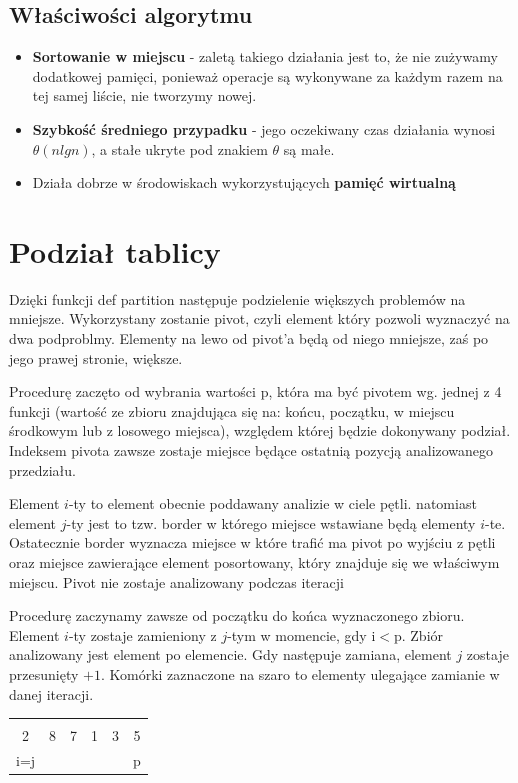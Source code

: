 \documentclass[a4paper,11pt]{report}
\begin{document}
\subsection*{Właściwości algorytmu}
\begin{itemize}
\item \textbf{Sortowanie w miejscu} - zaletą takiego działania jest to, że nie zużywamy dodatkowej pamięci, ponieważ operacje są wykonywane za każdym razem na tej samej liście, nie tworzymy nowej.
\item \textbf{Szybkość średniego przypadku} - jego oczekiwany czas działania wynosi $\theta(nlgn)$, a stałe ukryte pod znakiem $\theta$ są małe.
\item Działa dobrze w środowiskach wykorzystujących \textbf{pamięć wirtualną}
\end{itemize}
\newpage
\section{Podział tablicy}
Dzięki funkcji def partition następuje podzielenie większych problemów na mniejsze. Wykorzystany zostanie pivot, czyli element który pozwoli wyznaczyć na dwa podproblmy. Elementy na lewo od pivot'a będą od niego mniejsze, zaś po jego prawej stronie, większe.


Procedurę zaczęto od wybrania wartości p, która ma być pivotem wg. jednej z 4 funkcji (wartość ze zbioru znajdująca się na: końcu, początku, w miejscu środkowym lub z losowego miejsca), względem której będzie dokonywany podział. Indeksem pivota zawsze zostaje miejsce będące ostatnią pozycją analizowanego przedziału.


Element $i$-ty to element obecnie poddawany analizie w ciele pętli. natomiast element $j$-ty jest to tzw. border 
w którego miejsce wstawiane będą elementy $i$-te. Ostatecznie border wyznacza miejsce w które trafić ma pivot po wyjściu z pętli oraz miejsce zawierające element posortowany, który znajduje się we właściwym miejscu. Pivot nie zostaje analizowany podczas iteracji


Procedurę zaczynamy zawsze od początku do końca wyznaczonego zbioru. Element $i$-ty zostaje zamieniony z $j$-tym w momencie, gdy i$<$p. Zbiór analizowany jest element po elemencie. Gdy następuje zamiana, element $j$ zostaje przesunięty $+1$. Komórki zaznaczone na szaro to elementy ulegające zamianie w danej iteracji.
\begin{table}[h!]
\Large
\centering
\begin{tabular}{|c|c|c|c|c|c|}
\hline
\cellcolor{black!25} &  &  &  &  & \\
\cellcolor{black!25}2 & 8 & 7 & 1 & 3 & 5 \\ \hdashline
i=j&  & &  &  & p\\ \hline
\end{tabular}

\end{table}
\end{document}
